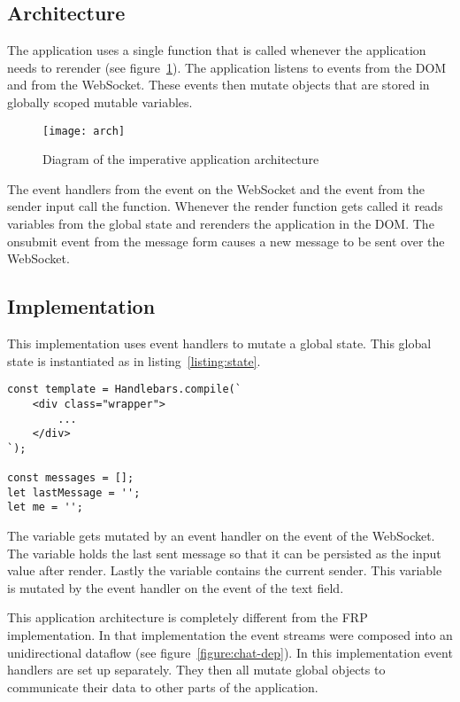 \subsection{Architecture}

The application uses a single  function that is called whenever the application needs to rerender (see figure~\ref{figure:arch}). The application listens to events from the DOM and from the WebSocket. These events then mutate objects that are stored in globally scoped mutable variables.

\begin{figure}[H]
	\centering
	\texttt{[image: arch]}
	\caption{Diagram of the imperative application architecture}
	\label{figure:arch}
\end{figure}

The event handlers from the  event on the WebSocket and the  event from the sender input call the  function. Whenever the render function gets called it reads variables from the global state and rerenders the application in the DOM. The onsubmit event from the message form causes a new message to be sent over the WebSocket.

\subsection{Implementation}

This implementation uses event handlers to mutate a global state. This global state is instantiated as in listing~\ref{listing:state}.

\begin{lstlisting}[caption=The global variables that make up the application state,label=listing:state]
const template = Handlebars.compile(`
	<div class="wrapper">
		...
	</div>
`);

const messages = [];
let lastMessage = '';
let me = '';
\end{lstlisting}

The  variable gets mutated by an event handler on the  event of the WebSocket. The  variable holds the last sent message so that it can be persisted as the input value after render. Lastly the  variable contains the current sender. This variable is mutated by the event handler on the  event of the text field.

This application architecture is completely different from the FRP implementation. In that implementation the event streams were composed into an unidirectional dataflow (see figure~\ref{figure:chat-dep}). In this implementation event handlers are set up separately. They then all mutate global objects to communicate their data to other parts of the application. 

